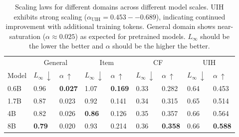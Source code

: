 \documentclass[]{fairmeta}
\begin{document}
\begin{table}[h]
\caption{Scaling laws for different domains across different model scales. UIH exhibits strong scaling ($ \alpha_{\text{UIH}} = 0.453--0.689$), indicating continued improvement with additional training tokens. General domain shows near-saturation ($\alpha \approx0.025$) as expected for pretrained models. $L_\infty$ should be the lower the better and $\alpha$ should be the higher the better.}
\label{tab:model_scale}
\centering
\small
\begin{tabular}{lllllllll}
\toprule
      & \multicolumn{2}{c}{General}                      & \multicolumn{2}{c}{Item}   & \multicolumn{2}{c}{CF}     & \multicolumn{2}{c}{UIH}    \\
Model & $L_\infty\ \downarrow$ & $\alpha\ \uparrow$ & $L_\infty\ \downarrow$ & $\alpha\ \uparrow$ & $L_\infty\ \downarrow$ & $\alpha\ \uparrow$ & $L_\infty\ \downarrow$ & $\alpha\ \uparrow$ \\
\midrule
0.6B  & 0.96 &  \textbf{0.027} &   1.07 &  \textbf{0.169} &   0.33 &  0.282 & 0.64 &  0.453 \\
1.7B  &  0.87 &  0.023 &  0.92 &  0.141 & 0.34 & 0.315 & 0.65 &  0.514 \\
4B    &  0.82 & 0.026 &   \textbf{0.86} &  0.126 & 0.35 &  0.357 &  0.66 &  0.564 \\
8B    & \textbf{0.79} & 0.020 &  0.93 & 0.214 &  0.36 &   \textbf{0.358} &  0.66 & \textbf{0.588} \\
\bottomrule
\end{tabular}
\end{table}
\end{document}
